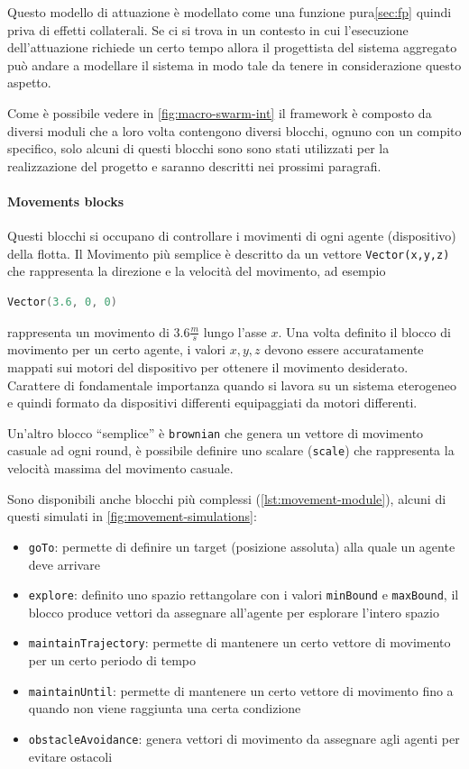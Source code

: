 \documentclass[12pt,a4paper,openright,twoside]{book}
\begin{document}
Questo modello di attuazione è modellato come una funzione pura\cref{sec:fp} quindi priva di effetti collaterali. Se ci si trova in un contesto in cui l'esecuzione dell'attuazione richiede un certo tempo allora il progettista del sistema aggregato può andare a modellare il sistema in modo tale da tenere in considerazione questo aspetto.

Come è possibile vedere in \cref{fig:macro-swarm-int} \cite{Macroswarm} il framework è composto da diversi moduli che a loro volta contengono diversi blocchi, ognuno con un compito specifico, solo alcuni di questi blocchi sono sono stati utilizzati per la realizzazione del progetto e saranno descritti nei prossimi paragrafi.

\paragraph{Movements blocks} 
Questi blocchi si occupano di controllare i movimenti di ogni agente (dispositivo) della flotta. Il Movimento più semplice è descritto da un vettore \verb|Vector(x,y,z)| che rappresenta la direzione e la velocità del movimento, ad esempio 

\begin{lstlisting}[language=Scala, label={lst:vector-example}]
    Vector(3.6, 0, 0)
\end{lstlisting}

rappresenta un movimento di $3.6 \frac{m}{s}$ lungo l'asse $x$. Una volta definito il blocco di movimento per un certo agente, i valori $x,y,z$ devono essere accuratamente mappati sui motori del dispositivo per ottenere il movimento desiderato. Carattere di fondamentale importanza quando si lavora su un sistema eterogeneo e quindi formato da dispositivi differenti equipaggiati da motori differenti.

Un'altro blocco ``semplice'' è \verb|brownian| che genera un vettore di movimento casuale ad ogni round, è possibile definire uno scalare (\verb|scale|) che rappresenta la velocità massima del movimento casuale.

Sono disponibili anche blocchi più complessi (\cref{lst:movement-module}), alcuni di questi simulati in \cref{fig:movement-simulations}:
\begin{itemize}
    \item \verb|goTo|: permette di definire un target (posizione assoluta) alla quale un agente deve arrivare
    \item \verb|explore|: definito uno spazio rettangolare con i valori \verb|minBound| e \verb|maxBound|, il blocco produce vettori da assegnare all'agente per esplorare l'intero spazio
    \item \verb|maintainTrajectory|: permette di mantenere un certo vettore di movimento per un certo periodo di tempo
    \item \verb|maintainUntil|: permette di mantenere un certo vettore di movimento fino a quando non viene raggiunta una certa condizione
    \item \verb|obstacleAvoidance|: genera vettori di movimento da assegnare agli agenti per evitare ostacoli
\end{itemize}
\end{document}
